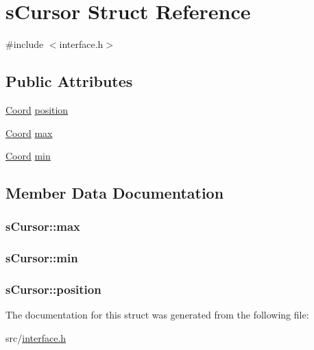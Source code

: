 \hypertarget{structs_cursor}{\section{s\-Cursor Struct Reference}
\label{structs_cursor}
}


{\ttfamily \#include $<$interface.\-h$>$}

\subsection*{Public Attributes}
\begin{DoxyCompactItemize}
\item 
\hyperlink{coordonates_8h_aff9d4468ac7a973ce7e5cfb5bd39bc33}{Coord} \hyperlink{structs_cursor_a3da303b3a96ff995ab27655c21b07540}{position}
\item 
\hyperlink{coordonates_8h_aff9d4468ac7a973ce7e5cfb5bd39bc33}{Coord} \hyperlink{structs_cursor_ae109344a745715e12758f771af3bc49e}{max}
\item 
\hyperlink{coordonates_8h_aff9d4468ac7a973ce7e5cfb5bd39bc33}{Coord} \hyperlink{structs_cursor_acecd2c1d0d245bcb270246d5797e9e7c}{min}
\end{DoxyCompactItemize}


\subsection{Member Data Documentation}
\hypertarget{structs_cursor_ae109344a745715e12758f771af3bc49e}{
\subsubsection[{max}]{ s\-Cursor\-::max}}\label{structs_cursor_ae109344a745715e12758f771af3bc49e}
\hypertarget{structs_cursor_acecd2c1d0d245bcb270246d5797e9e7c}{
\subsubsection[{min}]{ s\-Cursor\-::min}}\label{structs_cursor_acecd2c1d0d245bcb270246d5797e9e7c}
\hypertarget{structs_cursor_a3da303b3a96ff995ab27655c21b07540}{
\subsubsection[{position}]{ s\-Cursor\-::position}}\label{structs_cursor_a3da303b3a96ff995ab27655c21b07540}


The documentation for this struct was generated from the following file\-:\begin{DoxyCompactItemize}
\item 
src/\hyperlink{interface_8h}{interface.\-h}\end{DoxyCompactItemize}
